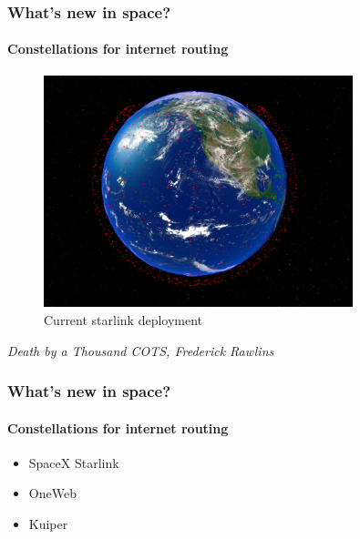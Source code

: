 \documentclass{beamer}
\begin{document}
\begin{frame}
  \frametitle{What's new in space?}
  \framesubtitle{Constellations for internet routing}
  \begin{figure}
      \includegraphics[width=0.8\textwidth]{images/starlink_current.png}
      \caption{Current starlink deployment}
      \label{fig:space_segment}
  \end{figure}
  \textit{Death by a Thousand COTS, Frederick Rawlins}~\cite{rawlins2022death}
\end{frame}

\begin{frame}
  \frametitle{What's new in space?}
  \framesubtitle{Constellations for internet routing}
  \begin{itemize}
    \item SpaceX Starlink
    \item OneWeb
    \item Kuiper
  \end{itemize}
\end{frame}
\end{document}
